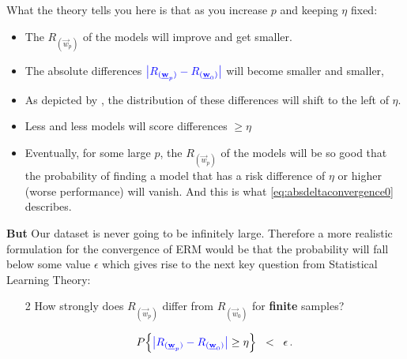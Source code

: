 {\begin{itemize}
			What the theory tells you here is that as you increase $p$ and keeping $\eta$ fixed:
			\begin{itemize}
				\item The $R_{(\vec w_p)}$ of the models will improve and get smaller.
				\item The absolute differences ${\color{question1}\big|R_{(\vec w_p)} - R_{(\vec w_0)}\big|}$ will become smaller and smaller,
				\item As depicted by , the distribution of these differences will shift to the left of $\eta$.
				\item Less and less models will score differences $\ge \eta$
				\item Eventually, for some large $p$, the $R_{(\vec w_p)}$ of the models will be so good that the probability of finding a model that has a risk difference of $\eta$ or higher (worse performance) will vanish. And this is what \eqref{eq:absdeltaconvergence0} describes.
			\end{itemize}
			\end{itemize}
			
			\textbf{But} Our dataset is never going to be infinitely large. Therefore a more realistic formulation for the convergence of ERM would be that the probability will fall below some value $\epsilon$ which gives rise to the next key question from Statistical Learning Theory:
            
            \begin{enumerate}
            \item[2] How strongly does $R_{(\vec{w}_p)}$ differ 
				from $R_{(\vec{w}_0)}$ for  \textbf{finite} samples?
				\vspace{1mm}
				\vspace{1mm}
                
                \begin{equation}
					P \Big\{ {\color{question1} 
							\big| R_{(\vec{w}_p)} - R_{(\vec{w}_0)} \big| 
						} \geq \eta \Big\} \;\;<\;\; \epsilon \,.
						\label{eq:convergenceeps}
				\end{equation}
            \end{enumerate}
            
}
